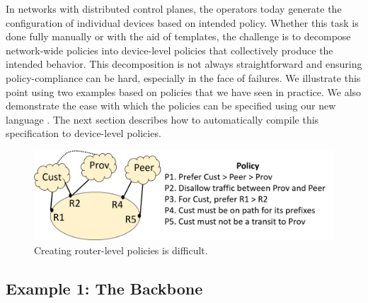 %

In networks with distributed control planes, the operators today generate the configuration of individual devices based on intended policy. Whether this task is done fully manually or with the aid of templates, the challenge is to decompose network-wide policies 
into device-level policies that collectively produce the intended behavior.
This decomposition is not always straightforward and ensuring policy-compliance can be hard, especially in the face of failures. We illustrate this point using two examples based on policies that we have seen in practice. We also demonstrate the ease with which the
policies can be specified using our new language \sysname. The next section describes how to automatically compile this specification to device-level policies.

\begin{figure}[t!]
\centering
\includegraphics[width=\columnwidth]{figures/example1}
\caption{Creating router-level policies is difficult.}
\label{fig:example1}
\end{figure}


\subsection{Example 1:  The Backbone}

